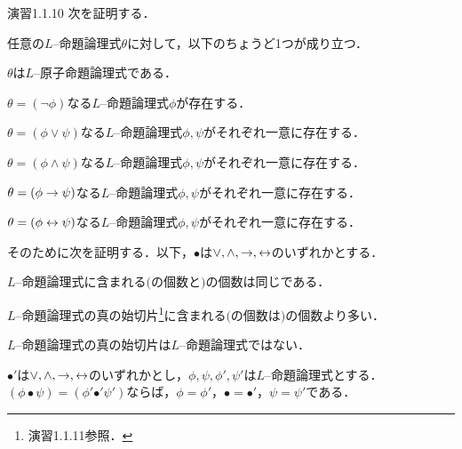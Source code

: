 \begin{excfield}{演習1.1.10}
  次を証明する．
  \begin{prp}[一意可読性][i_1_10_ur]
    任意の$L$--命題論理式$\theta$に対して，以下のちょうど1つが成り立つ．
    \begin{myenum}
      \item \label{i_1_10_ur_1}
      $\theta$は$L$--原子命題論理式である．
      \item \label{i_1_10_ur_2}
      $\theta = (\lnot \phi)$なる$L$--命題論理式$\phi$が存在する．
      \item \label{i_1_10_ur_3}
      $\theta = (\phi \lor \psi)$なる$L$--命題論理式$\phi, \psi$がそれぞれ一意に存在する．
      \item \label{i_1_10_ur_4}
      $\theta = (\phi \land \psi)$なる$L$--命題論理式$\phi, \psi$がそれぞれ一意に存在する．
      \item \label{i_1_10_ur_5}
      $\theta = (\phi \rightarrow \psi)$なる$L$--命題論理式$\phi, \psi$がそれぞれ一意に存在する．
      \item \label{i_1_10_ur_6}
      $\theta = (\phi \leftrightarrow \psi)$なる$L$--命題論理式$\phi, \psi$がそれぞれ一意に存在する．
    \end{myenum}
  \end{prp}

  そのために次を証明する．以下，$\bullet$は$\lor, \land, \rightarrow, \leftrightarrow$のいずれかとする．
  \begin{lem}
    \begin{thmlist}[n]
      \item \label{i_1_10_lem_preq}
      $L$--命題論理式に含まれる$($の個数と$)$の個数は同じである．
      \item \label{i_1_10_lem_prg}
      $L$--命題論理式の真の始切片\footnote{演習1.1.11参照．}に含まれる$($の個数は$)$の個数より多い．
      \item \label{i_1_10_lem_iniseg}
      $L$--命題論理式の真の始切片は$L$--命題論理式ではない．
      \item \label{i_1_10_lem_conn}
      $\bullet'$は$\lor, \land , \rightarrow, \leftrightarrow$のいずれかとし，$\phi, \psi, \phi', \psi'$は$L$--命題論理式とする．$(\phi \bullet \psi) = (\phi' \mathbin{\bullet'} \psi')$ならば，$\phi = \phi'$，$\bullet = \bullet'$，$\psi = \psi'$である．
    \end{thmlist}

    \tcblower


\end{lem}
\end{excfield}
